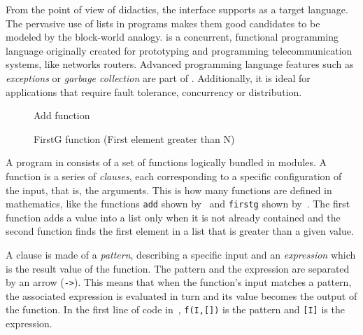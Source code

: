 From the point of view of didactics, the interface supports \erlang as
a target language. The pervasive use of lists in \erlang programs
makes them good candidates to be modeled by the block\hyp{}world
analogy. \erlang is a concurrent, functional programming language
originally created for prototyping and programming telecommunication
systems, like networks routers. Advanced programming language features
such as \emph{exceptions} or \emph{garbage collection} are part of
\erlang. Additionally, it is ideal for applications that require fault
tolerance, concurrency or distribution.

\renewcommand*\FancyVerbStartString{BEGIN-ADD}
\renewcommand*\FancyVerbStopString{END-ADD}
\begin{figure}[b]
  \caption{Add function}
  \label{fig:code:add}
\end{figure}

\renewcommand*\FancyVerbStartString{BEGIN-FIRSTG}
\renewcommand*\FancyVerbStopString{END-FIRSTG}
\begin{figure}[b]
  \caption{FirstG function (First element greater than N)}
  \label{fig:code:firstg}
\end{figure}

A program in \erlang consists of a set of functions logically bundled
in modules. A function is a series of \emph{clauses}, each
corresponding to a specific configuration of the input, that is, the
arguments. This is how many functions are defined in mathematics, like
the functions \texttt{add} shown by~ and
\texttt{firstg} shown by~. The first function
adds a value into a list only when it is not already contained and the
second function finds the first element in a list that is greater than
a given value.

A clause is made of a \emph{pattern}, describing a specific input and
an \emph{expression} which is the result value of the function. The
pattern and the expression are separated by an arrow
(\verb|->|). This means that when the function's input
matches a pattern, the associated expression is evaluated in turn and
its value becomes the output of the function. In the first line of
code in~, \texttt{f(I,[])} is the pattern and
\texttt{[I]} is the expression.


